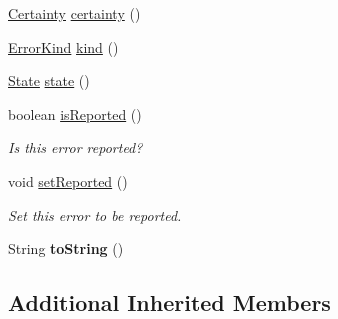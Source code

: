 \begin{DoxyCompactItemize}
\item 
\hyperlink{enumedu_1_1udel_1_1cis_1_1vsl_1_1civl_1_1model_1_1IF_1_1CIVLException_1_1Certainty}{Certainty} \hyperlink{classedu_1_1udel_1_1cis_1_1vsl_1_1civl_1_1log_1_1IF_1_1CIVLExecutionException_a1051f1c2d8fae9ee8b02ea981766cd71}{certainty} ()
\item 
\hyperlink{enumedu_1_1udel_1_1cis_1_1vsl_1_1civl_1_1model_1_1IF_1_1CIVLException_1_1ErrorKind}{Error\+Kind} \hyperlink{classedu_1_1udel_1_1cis_1_1vsl_1_1civl_1_1log_1_1IF_1_1CIVLExecutionException_a86f614a7be70191590babf327e56f5e4}{kind} ()
\item 
\hyperlink{interfaceedu_1_1udel_1_1cis_1_1vsl_1_1civl_1_1state_1_1IF_1_1State}{State} \hyperlink{classedu_1_1udel_1_1cis_1_1vsl_1_1civl_1_1log_1_1IF_1_1CIVLExecutionException_a3493ea22e2d903f3c60cc13d8ca7839b}{state} ()
\item 
boolean \hyperlink{classedu_1_1udel_1_1cis_1_1vsl_1_1civl_1_1log_1_1IF_1_1CIVLExecutionException_a5437d0bc5729dad9b91f895877ebc0e2}{is\+Reported} ()
\begin{DoxyCompactList}\small\item\em Is this error reported? \end{DoxyCompactList}\item 
\hypertarget{classedu_1_1udel_1_1cis_1_1vsl_1_1civl_1_1log_1_1IF_1_1CIVLExecutionException_ae20971e009171d8df1c09bb5661c2545}{}void \hyperlink{classedu_1_1udel_1_1cis_1_1vsl_1_1civl_1_1log_1_1IF_1_1CIVLExecutionException_ae20971e009171d8df1c09bb5661c2545}{set\+Reported} ()\label{classedu_1_1udel_1_1cis_1_1vsl_1_1civl_1_1log_1_1IF_1_1CIVLExecutionException_ae20971e009171d8df1c09bb5661c2545}

\begin{DoxyCompactList}\small\item\em Set this error to be reported. \end{DoxyCompactList}\item 
\hypertarget{classedu_1_1udel_1_1cis_1_1vsl_1_1civl_1_1log_1_1IF_1_1CIVLExecutionException_acbe11b24e704034cd9f750f5654ccf0b}{}String {\bfseries to\+String} ()\label{classedu_1_1udel_1_1cis_1_1vsl_1_1civl_1_1log_1_1IF_1_1CIVLExecutionException_acbe11b24e704034cd9f750f5654ccf0b}

\end{DoxyCompactItemize}
\subsection*{Additional Inherited Members}


